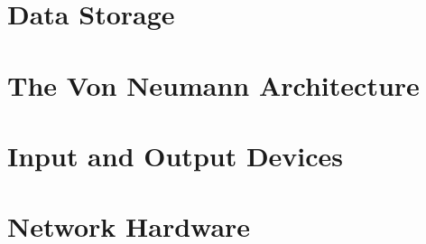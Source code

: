 \documentclass[../main.tex]{subfiles}
\begin{document}
\section{Data Storage}
\label{3:sec:data_storage}



\section{The Von Neumann Architecture}
\label{3:sec:von_neumann}


\section{Input and Output Devices}
\label{3:sec:input_and_output_devices}


\section{Network Hardware}
\label{3:sec:network_hardware}

\end{document}
